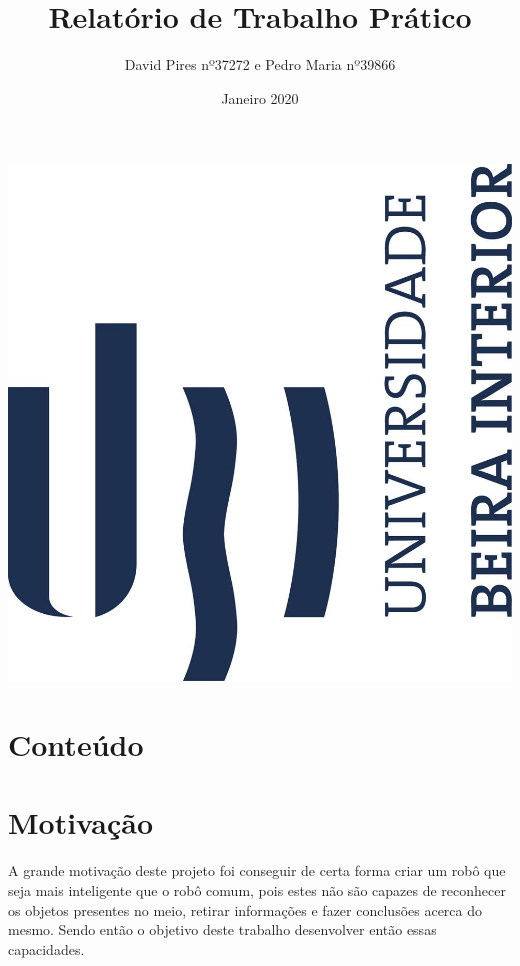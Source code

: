 \documentclass{article}
\title{Relatório de Trabalho Prático}
\author{David Pires nº37272 e Pedro Maria nº39866}
\date{Janeiro 2020}
\begin{document}
\begin{titlepage}
    \maketitle

    \includegraphics[scale=0.5]{logo_ubi_vprincipal.jpg}

\end{titlepage}

\section{Conteúdo}

\tableofcontents

\newpage

\section{Motivação}

A grande motivação deste projeto foi conseguir de certa forma criar um robô que seja mais inteligente que o robô comum, pois estes não são capazes de reconhecer os objetos presentes no meio, retirar informações e fazer conclusões acerca do mesmo. Sendo então o objetivo deste trabalho desenvolver então essas capacidades.
\end{document}
